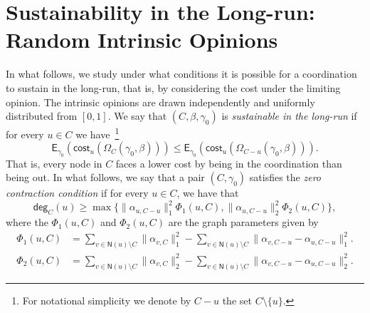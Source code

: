 \documentclass[letterpaper,11pt]{article}
\newcommand{\EE}{\mathsf{E}}
\newcommand{\nsf}{\mathsf{N}}
\newcommand{\cost}{\mathsf{cost}}
\newcommand{\degsf}{\mathsf{deg}}
\newcommand{\vvcom}[1]{\todo[color=red!25!white]{Victor: #1}}
\begin{document}
\section{Sustainability in the Long-run: Random Intrinsic Opinions}

In what follows, we study under what conditions it is possible for a coordination to sustain in the long-run, that is, by considering the cost under the limiting opinion.
The intrinsic opinions are drawn independently and uniformly distributed from $[0,1]$.
We say that $(C,\beta,\gamma_0)$ is {\it sustainable in the long-run} if for every $u\in C$ we have~\footnote{For notational simplicity we denote by $C-u$ the set $C\setminus \{u\}$.} 
\begin{equation*}
\EE_{\gamma_0}(\cost_u(\Omega_C(\gamma_0,\beta)))\le \EE_{\gamma_0}(\cost_u(\Omega_{C-u}(\gamma_0,\beta))).
\end{equation*}
That is, every node in $C$ faces a lower cost by being in the coordination than being out.
In what follows, we say that a pair $(C,\gamma_0)$ satisfies the {\it zero contraction condition} if for every $u\in C$, we have that 
\begin{equation*}
\degsf_C(u)\ge \max\Big\{\|\alpha_{u,C-u}\|_1^2\Phi_1(u,C),\|\alpha_{u,C-u}\|_2^2\Phi_2(u,C)\Big\},
\end{equation*}
where the $\Phi_1(u,C)$ and $\Phi_2(u,C)$ are the graph parameters given by 
\begin{align*}
\Phi_1(u,C)&=\sum_{v\in \nsf(u)\setminus C}\|\alpha_{v,C}\|_1^2-\sum_{v\in \nsf(u)\setminus C}\|\alpha_{v,C-u}-\alpha_{u,C-u}\|_1^2.\\
\Phi_2(u,C)&=\sum_{v\in \nsf(u)\setminus C}\|\alpha_{v,C}\|_2^2-\sum_{v\in \nsf(u)\setminus C}\|\alpha_{v,C-u}-\alpha_{u,C-u}\|_2^2.
\end{align*}
\end{document}
